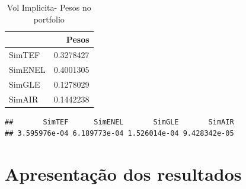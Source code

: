 \documentclass[
  12pt,
  a4paper,
  openany]{book}
\newenvironment{Shaded}{\begin{snugshade}}{\end{snugshade}}
\newcommand{\DataTypeTok}[1]{\textcolor[rgb]{0.13,0.29,0.53}{#1}}
\newcommand{\DecValTok}[1]{\textcolor[rgb]{0.00,0.00,0.81}{#1}}
\newcommand{\FloatTok}[1]{\textcolor[rgb]{0.00,0.00,0.81}{#1}}
\newcommand{\KeywordTok}[1]{\textcolor[rgb]{0.13,0.29,0.53}{\textbf{#1}}}
\newcommand{\NormalTok}[1]{#1}
\newcommand{\OperatorTok}[1]{\textcolor[rgb]{0.81,0.36,0.00}{\textbf{#1}}}
\newcommand{\StringTok}[1]{\textcolor[rgb]{0.31,0.60,0.02}{#1}}
\begin{document}
\normalsize

\begin{table}[!h]

\caption{\label{tab:unnamed-chunk-55}Vol Implicita- Pesos no portfolio}
\centering
\begin{tabular}[t]{lr}
\toprule
  & Pesos\\
\midrule
SimTEF & 0.3278427\\
SimENEL & 0.4001305\\
SimGLE & 0.1278029\\
SimAIR & 0.1442238\\
\bottomrule
\end{tabular}
\end{table}

\scriptsize

\begin{Shaded}
\end{Shaded}

\begin{verbatim}
##       SimTEF      SimENEL       SimGLE       SimAIR 
## 3.595976e-04 6.189773e-04 1.526014e-04 9.428342e-05
\end{verbatim}

\begin{Shaded}
\end{Shaded}

\normalsize

\hypertarget{apresentauxe7uxe3o-dos-resultados}{%
\chapter{Apresentação dos resultados}\label{apresentauxe7uxe3o-dos-resultados}}
\end{document}

